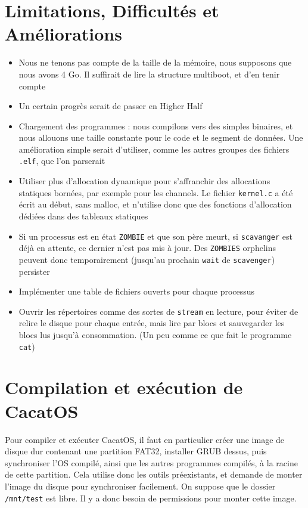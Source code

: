 \documentclass[a4paper,10pt, french]{article}
\newcommand{\code}[1]{\texttt{#1}}
\begin{document}
\section{Limitations, Difficultés et Améliorations}
\begin{itemize}
 \item Nous ne tenons pas compte de la taille de la mémoire, nous supposons que nous avons 4 Go.
 Il suffirait de lire la structure multiboot, et d'en tenir compte
 \item Un certain progrès serait de passer en Higher Half
 \item Chargement des programmes : nous compilons vers des simples binaires, et nous allouons une 
 taille constante pour le code et le segment de données. Une amélioration simple serait
 d'utiliser, comme les autres groupes des fichiers \code{.elf}, que l'on parserait
 \item Utiliser plus d'allocation dynamique pour s'affranchir des allocations statiques bornées, par exemple pour les channels. Le fichier
 \code{kernel.c} a été écrit au début, sans malloc, et n'utilise donc que des fonctions d'allocation dédiées dans des tableaux statiques
 \item Si un processus est en état \code{ZOMBIE} et que son père meurt, si \code{scavanger} est 
 déjà en attente, ce dernier n'est pas mis à jour. Des \code{ZOMBIES} orphelins peuvent donc temporairement (jusqu'au prochain \code{wait} de \code{scavenger}) persister
 \item Implémenter une table de fichiers ouverts pour chaque processus
 \item Ouvrir les répertoires comme des sortes de \code{stream} en lecture, pour éviter de relire le disque pour chaque
 entrée, mais lire par blocs et sauvegarder les blocs lus jusqu'à consommation. (Un peu comme ce que fait le
 programme \code{cat})
\end{itemize}

\section{Compilation et exécution de CacatOS}
Pour compiler et exécuter CacatOS, il faut en particulier créer une image de disque dur contenant une partition FAT32,
installer GRUB dessus, puis synchroniser l'OS compilé, ainsi que les autres programmes compilés, à la racine de
cette partition.
Cela utilise donc les outils préexistants, et demande de monter l'image du disque pour synchroniser facilement.
On suppose que le dossier \code{/mnt/test} est libre.
Il y a donc besoin de permissions pour monter cette image.
\end{document}
